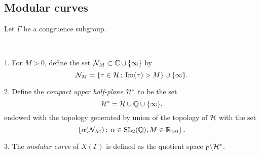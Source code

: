 \subsection{Modular curves}

Let $\Gamma$ be a congruence subgroup.

\begin{defi} \ 

  1. For $M>0$, define the set $\mathcal{N}_M \subset \mathbb{C}\cup\{\infty\}$ by
	\[\mathcal{N}_M=\left\{\tau\in\mathcal{H}\,;\; \operatorname{Im}(\tau)>M\right\}\cup\{\infty\}.\]

  2. Define the \emph{compact upper half-plane} $\mathcal{H}^*$ to be the set
	\[\mathcal{H}^*=\mathcal{H}\cup\mathbb{Q}\cup\{\infty\},\]
	endowed with the topology generated by union of the topology of $\mathcal{H}$ with the set
	\[\left\{\alpha(\mathcal{N_M})\,;\; \alpha\in\operatorname{SL}_2(\mathbb{Q}), M\in\mathbb{R}_{>0}\right\}.\]
	
	3. The \emph{modular curve} of $X(\Gamma)$ is defined as the quotient space $_\Gamma\backslash\mathcal{H}^*$.
\end{defi}






